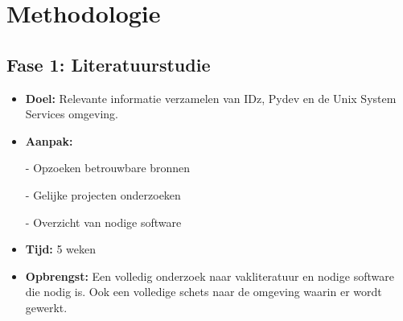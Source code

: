 
\chapter{Methodologie}%
\label{ch:methodologie}


\section{Fase 1: Literatuurstudie}
\label{sec:m-literatuurstudie}
\begin{itemize}
    \item \textbf{Doel:}
    Relevante informatie verzamelen van IDz, Pydev en de Unix System Services omgeving.
    \item \textbf{Aanpak:}
    \item[-] Opzoeken betrouwbare bronnen
    \item[-] Gelijke projecten onderzoeken
    \item[-] Overzicht van nodige software
    \item \textbf{Tijd:} 5 weken
    \item \textbf{Opbrengst:}
    Een volledig onderzoek naar vakliteratuur en nodige software die nodig is. Ook een volledige schets naar de omgeving waarin er wordt gewerkt.
\end{itemize}


